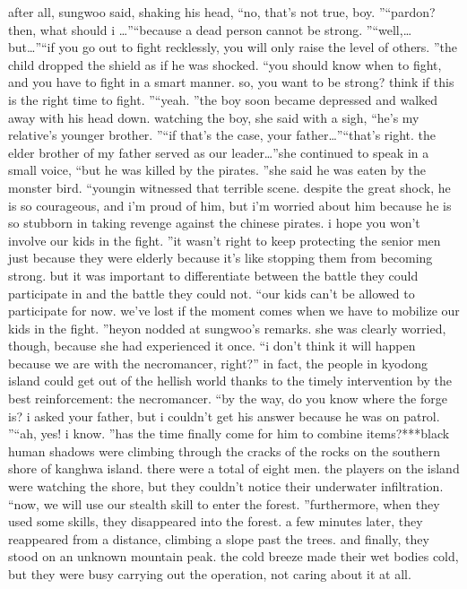 after all, sungwoo said, shaking his head, “no, that’s not true, boy.
”“pardon? then, what should i …”“because a dead person cannot be strong.
”“well,… but…”“if you go out to fight recklessly, you will only raise the level of others.
”the child dropped the shield as if he was shocked.
“you should know when to fight, and you have to fight in a smart manner.
 so, you want to be strong? think if this is the right time to fight.
”“yeah.
”the boy soon became depressed and walked away with his head down.
watching the boy, she said with a sigh, “he’s my relative’s younger brother.
”“if that’s the case, your father…”“that’s right.
 the elder brother of my father served as our leader…”she continued to speak in a small voice, “but he was killed by the pirates.
”she said he was eaten by the monster bird.
“youngin witnessed that terrible scene.
 despite the great shock, he is so courageous, and i’m proud of him, but i’m worried about him because he is so stubborn in taking revenge against the chinese pirates.
 i hope you won’t involve our kids in the fight.
”it wasn’t right to keep protecting the senior men just because they were elderly because it’s like stopping them from becoming strong.
 but it was important to differentiate between the battle they could participate in and the battle they could not.
“our kids can’t be allowed to participate for now.
 we’ve lost if the moment comes when we have to mobilize our kids in the fight.
”heyon nodded at sungwoo’s remarks.
 she was clearly worried, though, because she had experienced it once.
“i don’t think it will happen because we are with the necromancer, right?”
in fact, the people in kyodong island could get out of the hellish world thanks to the timely intervention by the best reinforcement: the necromancer.
“by the way, do you know where the forge is? i asked your father, but i couldn’t get his answer because he was on patrol.
 ”“ah, yes! i know.
”has the time finally come for him to combine items?***black human shadows were climbing through the cracks of the rocks on the southern shore of kanghwa island.
 there were a total of eight men.
the players on the island were watching the shore, but they couldn’t notice their underwater infiltration.
“now, we will use our stealth skill to enter the forest.
”furthermore, when they used some skills, they disappeared into the forest.
a few minutes later, they reappeared from a distance, climbing a slope past the trees.
and finally, they stood on an unknown mountain peak.
 the cold breeze made their wet bodies cold, but they were busy carrying out the operation, not caring about it at all.
